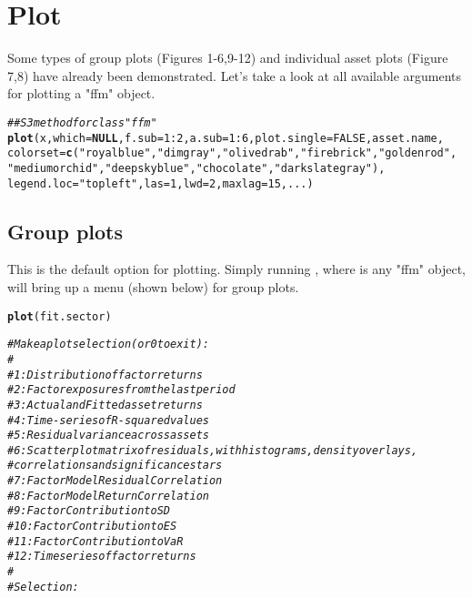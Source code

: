 \documentclass[a4paper]{article}\usepackage[]{graphicx}\usepackage[]{color}
\makeatletter
\newcommand{\hlnum}[1]{\textcolor[rgb]{0.686,0.059,0.569}{#1}}%
\newcommand{\hlstr}[1]{\textcolor[rgb]{0.192,0.494,0.8}{#1}}%
\newcommand{\hlcom}[1]{\textcolor[rgb]{0.678,0.584,0.686}{\textit{#1}}}%
\newcommand{\hlopt}[1]{\textcolor[rgb]{0,0,0}{#1}}%
\newcommand{\hlstd}[1]{\textcolor[rgb]{0.345,0.345,0.345}{#1}}%
\newcommand{\hlkwa}[1]{\textcolor[rgb]{0.161,0.373,0.58}{\textbf{#1}}}%
\newcommand{\hlkwc}[1]{\textcolor[rgb]{0.333,0.667,0.333}{#1}}%
\newcommand{\hlkwd}[1]{\textcolor[rgb]{0.737,0.353,0.396}{\textbf{#1}}}%
\newenvironment{kframe}{%
 \def\at@end@of@kframe{}%
 \ifinner\ifhmode%
  \def\at@end@of@kframe{\end{minipage}}%
  \begin{minipage}{\columnwidth}%
 \fi\fi%
 \def\FrameCommand##1{\hskip\@totalleftmargin \hskip-\fboxsep
 \colorbox{shadecolor}{##1}\hskip-\fboxsep
     \hskip-\linewidth \hskip-\@totalleftmargin \hskip\columnwidth}%
 \MakeFramed {\advance\hsize-\width
   \@totalleftmargin\z@ \linewidth\hsize
   \@setminipage}}%
 {\par\unskip\endMakeFramed%
 \at@end@of@kframe}
\newenvironment{knitrout}{}{} %
\makeatother
\begin{document}
\newpage

\section{Plot}

Some types of group plots (Figures 1-6,9-12) and individual asset plots (Figure 7,8) have already been demonstrated. Let's take a look at all available arguments for plotting a "ffm" object.
\begin{knitrout}
\color{fgcolor}\begin{kframe}
\begin{alltt}
\hlcom{## S3 method for class "ffm"}
\hlkwd{plot} \hlstd{(x,} \hlkwc{which}\hlstd{=}\hlkwa{NULL}\hlstd{,} \hlkwc{f.sub}\hlstd{=}\hlnum{1}\hlopt{:}\hlnum{2}\hlstd{,} \hlkwc{a.sub}\hlstd{=}\hlnum{1}\hlopt{:}\hlnum{6}\hlstd{,} \hlkwc{plot.single}\hlstd{=}\hlnum{FALSE}\hlstd{, asset.name,}
      \hlkwc{colorset}\hlstd{=}\hlkwd{c}\hlstd{(}\hlstr{"royalblue"}\hlstd{,}\hlstr{"dimgray"}\hlstd{,}\hlstr{"olivedrab"}\hlstd{,}\hlstr{"firebrick"}\hlstd{,} \hlstr{"goldenrod"}\hlstd{,}
                 \hlstr{"mediumorchid"}\hlstd{,}\hlstr{"deepskyblue"}\hlstd{,}\hlstr{"chocolate"}\hlstd{,}\hlstr{"darkslategray"}\hlstd{),}
      \hlkwc{legend.loc}\hlstd{=}\hlstr{"topleft"}\hlstd{,} \hlkwc{las}\hlstd{=}\hlnum{1}\hlstd{,} \hlkwc{lwd}\hlstd{=}\hlnum{2}\hlstd{,} \hlkwc{maxlag}\hlstd{=}\hlnum{15}\hlstd{, ...)}
\end{alltt}
\end{kframe}
\end{knitrout}

\subsection{Group plots}

This is the default option for plotting. Simply running , where  is any "ffm" object, will bring up a menu (shown below) for group plots.
\begin{knitrout}
\color{fgcolor}\begin{kframe}
\begin{alltt}
\hlkwd{plot}\hlstd{(fit.sector)}

\hlcom{# Make a plot selection (or 0 to exit):}
\hlcom{#}
\hlcom{#  1: Distribution of factor returns}
\hlcom{#  2: Factor exposures from the last period}
\hlcom{#  3: Actual and Fitted asset returns}
\hlcom{#  4: Time-series of R-squared values}
\hlcom{#  5: Residual variance across assets}
\hlcom{#  6: Scatterplot matrix of residuals, with histograms, density overlays,}
\hlcom{#     correlations and significance stars}
\hlcom{#  7: Factor Model Residual Correlation}
\hlcom{#  8: Factor Model Return Correlation}
\hlcom{#  9: Factor Contribution to SD}
\hlcom{# 10: Factor Contribution to ES}
\hlcom{# 11: Factor Contribution to VaR}
\hlcom{# 12: Time series of factor returns}
\hlcom{#}
\hlcom{# Selection:}
\end{alltt}
\end{kframe}
\end{knitrout}
\end{document}

